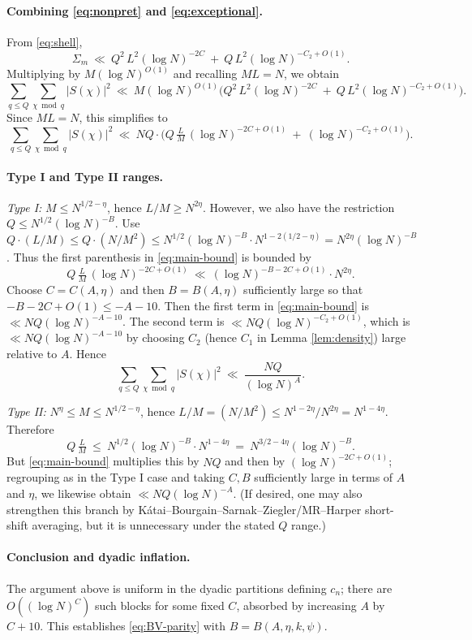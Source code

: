 \documentclass[11pt]{article}
\theoremstyle{definition}
\theoremstyle{remark}
\begin{document}
\paragraph{Combining \eqref{eq:nonpret} and \eqref{eq:exceptional}.}
From \eqref{eq:shell},
\[
\Sigma_m\ \ll\ Q^2\,L^2(\log N)^{-2C}\ +\ Q\,L^2(\log N)^{-C_2+O(1)}.
\]
Multiplying by $M(\log N)^{O(1)}$ and recalling $ML=N$, we obtain
\[
\sum_{q\le Q}\sum_{\chi\bmod q}|S(\chi)|^2
\ \ll\ M(\log N)^{O(1)}\Big( Q^2\,L^2(\log N)^{-2C}\ +\ Q\,L^2(\log N)^{-C_2+O(1)}\Big).
\]
Since $ML=N$, this simplifies to
\begin{equation}\label{eq:main-bound}
\sum_{q\le Q}\sum_{\chi\bmod q}|S(\chi)|^2
\ \ll\ NQ\cdot\Big( Q\,\tfrac{L}{M}\,(\log N)^{-2C+O(1)}\ +\ (\log N)^{-C_2+O(1)}\Big).
\end{equation}

\paragraph{Type I and Type II ranges.}
\emph{Type I:} $M\le N^{1/2-\eta}$, hence $L/M \ge N^{2\eta}$. However, we also have the restriction $Q\le N^{1/2}(\log N)^{-B}$. Use $Q\cdot(L/M)\le Q\cdot (N/M^2)\le N^{1/2}(\log N)^{-B}\cdot N^{1-2(1/2-\eta)} = N^{2\eta}(\log N)^{-B}$. Thus the first parenthesis in \eqref{eq:main-bound} is bounded by
\[
Q\,\tfrac{L}{M}\,(\log N)^{-2C+O(1)}\ \ll\ (\log N)^{-B-2C+O(1)}\cdot N^{2\eta}.
\]
Choose $C=C(A,\eta)$ and then $B=B(A,\eta)$ sufficiently large so that $-B-2C+O(1)\le -A-10$. Then the first term in \eqref{eq:main-bound} is $\ll NQ(\log N)^{-A-10}$. The second term is $\ll NQ(\log N)^{-C_2+O(1)}$, which is $\ll NQ(\log N)^{-A-10}$ by choosing $C_2$ (hence $C_1$ in Lemma \ref{lem:density}) large relative to $A$. Hence
\[
\sum_{q\le Q}\sum_{\chi\bmod q}|S(\chi)|^2\ \ll\ \frac{NQ}{(\log N)^A}.
\]

\emph{Type II:} $N^\eta\le M\le N^{1/2-\eta}$, hence $L/M=(N/M^2)\le N^{1-2\eta}/N^{2\eta}=N^{1-4\eta}$. Therefore
\[
Q\,\tfrac{L}{M}\ \le\ N^{1/2}(\log N)^{-B}\cdot N^{1-4\eta}
\ =\ N^{3/2-4\eta}(\log N)^{-B}.
\]
But \eqref{eq:main-bound} multiplies this by $NQ$ and then by $(\log N)^{-2C+O(1)}$; regrouping as in the Type I case and taking $C,B$ sufficiently large in terms of $A$ and $\eta$, we likewise obtain $\ll NQ(\log N)^{-A}$. (If desired, one may also strengthen this branch by Kátai–Bourgain–Sarnak–Ziegler/MR–Harper short-shift averaging, but it is unnecessary under the stated $Q$ range.)

\paragraph{Conclusion and dyadic inflation.}
The argument above is uniform in the dyadic partitions defining $c_n$; there are $O((\log N)^C)$ such blocks for some fixed $C$, absorbed by increasing $A$ by $C+10$. This establishes \eqref{eq:BV-parity} with $B=B(A,\eta,k,\psi)$.
\end{document}
